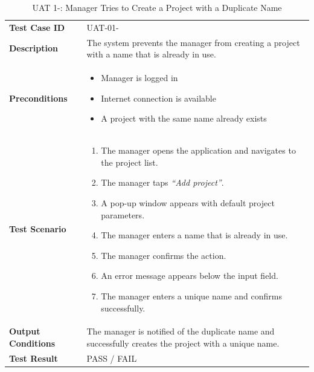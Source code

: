 \documentclass[12pt,a4paper]{article}
\begin{document}
\begin{table}[h]
\centering
\caption{UAT 1-: Manager Tries to Create a Project with a Duplicate Name}
\begin{tabularx}{\textwidth}{>{\bfseries}l X}
\toprule
Test Case ID & UAT-01- \\
Description & The system prevents the manager from creating a project with a name that is already in use. \\
Preconditions &
\begin{itemize}[noitemsep]
    \item Manager is logged in
    \item Internet connection is available
    \item A project with the same name already exists
\end{itemize} \\
Test Scenario &
\begin{enumerate}[noitemsep]
    \item The manager opens the application and navigates to the project list.
    \item The manager taps \emph{``Add project''}.
    \item A pop-up window appears with default project parameters.
    \item The manager enters a name that is already in use.
    \item The manager confirms the action.
    \item An error message appears below the input field.
    \item The manager enters a unique name and confirms successfully.
\end{enumerate} \\
Output Conditions & The manager is notified of the duplicate name and successfully creates the project with a unique name. \\
Test Result & PASS / FAIL \\
\bottomrule
\end{tabularx}
\end{table}
\end{document}
